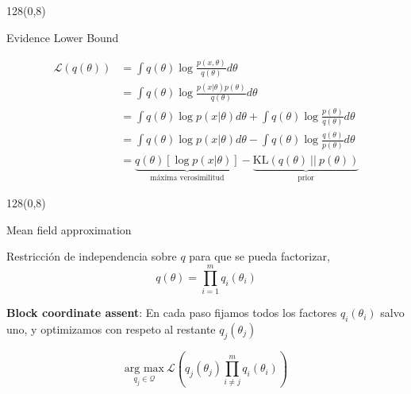 \documentclass[shownotes]{beamer}
\begin{document}
\begin{frame}
 \begin{textblock}{128}(0,8)
\begin{center}
 \large Evidence Lower Bound
\end{center}
\end{textblock}

\begin{equation*}
 \begin{split}
 \mathcal{L}(q(\theta)) &= \int q(\theta) \log \frac{p(x,\theta)}{q(\theta)} d\theta \\
 &= \int q(\theta) \log \frac{p(x|\theta) p(\theta)}{q(\theta)} d\theta \\
 & = \int q(\theta) \log p(x|\theta) d\theta + \int q(\theta) \log  \frac{ p(\theta)}{q(\theta)} d\theta \\
 & = \int q(\theta) \log p(x|\theta) d\theta - \int q(\theta) \log  \frac{ q(\theta)}{p(\theta)} d\theta \\
 & = \underbrace{{q(\theta)}[\log p(x|\theta)]}_{\text{m\'axima verosimilitud}} - \underbrace{\text{KL}(q(\theta) \ || \ p(\theta))}_{\text{prior}}
 \end{split}
\end{equation*}
 
\end{frame}


\begin{frame}
 \begin{textblock}{128}(0,8)
\begin{center}
 \large Mean field approximation
\end{center}
\end{textblock}
\vspace{0.5cm}

Restricci\'on de independencia sobre $q$ para que se pueda factorizar,
\begin{equation*}
 q(\theta) = \prod_{i=1}^m q_i(\theta_i)
\end{equation*}

\textbf{Block coordinate assent}: En cada paso fijamos todos los factores $q_i(\theta_i)$ salvo uno, y optimizamos con respeto al restante $q_j(\theta_j)$

\begin{equation*}
 \underset{q_j \in \mathcal{Q}}{\text{arg max}} \ \mathcal{L}(q_j(\theta_j)\prod_{i\neq j}^m q_i(\theta_i))
\end{equation*}

\end{frame}
\end{document}
